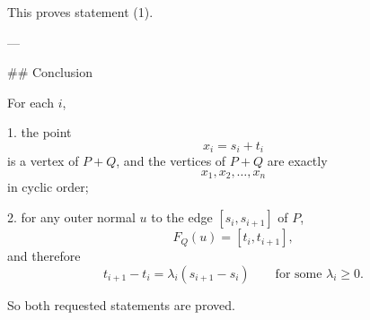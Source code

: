 This proves statement (1).

---

## Conclusion

For each \(i\),

1. the point
   \[
   x_i=s_i+t_i
   \]
   is a vertex of \(P+Q\), and the vertices of \(P+Q\) are exactly
   \[
   x_1,x_2,\dots,x_n
   \]
   in cyclic order;

2. for any outer normal \(u\) to the edge \([s_i,s_{i+1}]\) of \(P\),
   \[
   F_Q(u)=[t_i,t_{i+1}],
   \]
   and therefore
   \[
   t_{i+1}-t_i=\lambda_i(s_{i+1}-s_i)
   \qquad\text{for some }\lambda_i\ge 0.
   \]

So both requested statements are proved.